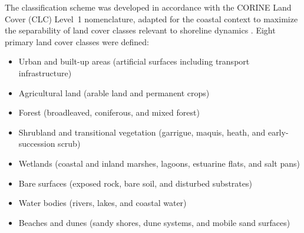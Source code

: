 \documentclass[remotesensing,article,submit,pdftex,moreauthors]{Definitions/mdpi}
\begin{document}
The classification scheme was developed in accordance with the CORINE Land Cover (CLC) Level~1 nomenclature, adapted for the coastal context to maximize the separability of land cover classes relevant to shoreline dynamics \citep{EEA_CLC2018, EEA_CLCchange}. Eight primary land cover classes were defined:
\begin{itemize}
\item Urban and built-up areas (artificial surfaces including transport infrastructure)
\item Agricultural land (arable land and permanent crops)
\item Forest (broadleaved, coniferous, and mixed forest)
\item Shrubland and transitional vegetation (garrigue, maquis, heath, and early-succession scrub)
\item Wetlands (coastal and inland marshes, lagoons, estuarine flats, and salt pans)
\item Bare surfaces (exposed rock, bare soil, and disturbed substrates)
\item Water bodies (rivers, lakes, and coastal water)
\item Beaches and dunes (sandy shores, dune systems, and mobile sand surfaces)
\end{itemize}
\end{document}
